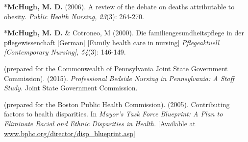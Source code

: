 \documentclass[10pt,]{article}
\begin{document}
{{{{{{{{{{{{{{{\begin{hangparas}{.25in}{1}
\end{hangparas}

\vspace{4mm}

\begin{hangparas}{.25in}{1}

*{\textbf {McHugh, M. D.}} (2006). A review of the debate on deaths attributable to obesity. {\textit {Public Health Nursing, 23}}(3): 264-270.

\end{hangparas}

\vspace{4mm}

\begin{hangparas}{.25in}{1}

*{\textbf {McHugh, M. D.}} \& Cotroneo, M (2000). Die familiengesundheitspflege in der pflegewissenchaft  [German] [Family health care in nursing] {\textit {Pflegeaktuell [Contemporary Nursing], 54}}(3): 146-149.

\end{hangparas}

\vspace{4mm}


\begin{hangparas}{.25in}{1}

 (prepared for the Commonwealth of Pennsylvania Joint State Government Commission). (2015). {\textit {Professional Bedside Nursing in Pennsylvania: A Staff Study.}} Joint State Government Commission.

\end{hangparas}

\vspace{4mm}

\begin{hangparas}{.25in}{1}

 (prepared for the Boston Public Health Commission). (2005). Contributing factors to health disparities. In {\textit {Mayor’s Task Force Blueprint: A Plan to Eliminate Racial and Ethnic Disparities in Health.}} [Available at \href{http://www.bphc.org/director/disp_blueprint.asp}{\ttfamily www.bphc.org/director/disp\_blueprint.asp}]

\end{hangparas}

\vspace{4mm}

}}}}}}}}}}}}}}}
\end{document}
